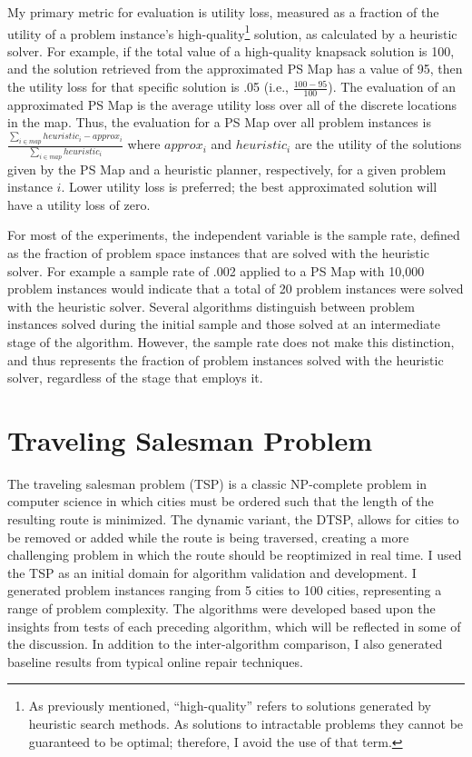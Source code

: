 My primary metric for evaluation is utility loss, measured as a fraction of the utility of a problem instance's high-quality\footnote{As previously mentioned, ``high-quality'' refers to solutions generated by heuristic search methods.  As solutions to intractable problems they cannot be guaranteed to be optimal; therefore, I avoid the use of that term.} solution, as calculated by a heuristic solver.  For example, if the total value of a high-quality knapsack solution is 100, and the solution retrieved from the approximated PS Map has a value of 95, then the utility loss for that specific solution is .05 (i.e., $\frac{100-95}{100}$).  The evaluation of an approximated PS Map is the average utility loss over all of the discrete locations in the map.  Thus, the evaluation for a PS Map over all problem instances is $\frac{\sum_{i \in map}heuristic_i-approx_i}{\sum_{i \in map}heuristic_i}$ where $approx_i$ and $heuristic_i$ are the utility of the solutions given by the PS Map and a heuristic planner, respectively, for a given problem instance $i$.  Lower utility loss is preferred; the best approximated solution will have a utility loss of zero.

For most of the experiments, the independent variable is the sample rate, defined as the fraction of problem space instances that are solved with the heuristic solver.  For example a sample rate of .002 applied to a PS Map with 10,000 problem instances would indicate that a total of 20 problem instances were solved with the heuristic solver. Several algorithms distinguish between problem instances solved during the initial sample and those solved at an intermediate stage of the algorithm.  However, the sample rate does not make this distinction, and thus represents the fraction of problem instances solved with the heuristic solver, regardless of the stage that employs it.
\section{Traveling Salesman Problem}

The traveling salesman problem (TSP) is a classic NP-complete problem in computer science in which cities must be ordered such that the length of the resulting route is minimized.  The dynamic variant, the DTSP, allows for cities to be removed or added while the route is being traversed, creating a more challenging problem in which the route should be reoptimized in real time.  I used the TSP as an initial domain for algorithm validation and development.  I generated problem instances ranging from 5 cities to 100 cities, representing a range of problem complexity.  The algorithms were developed based upon the insights from tests of  each preceding algorithm, which will be reflected in some of the discussion.  In addition to the inter-algorithm comparison, I also generated baseline results from typical online repair techniques.

